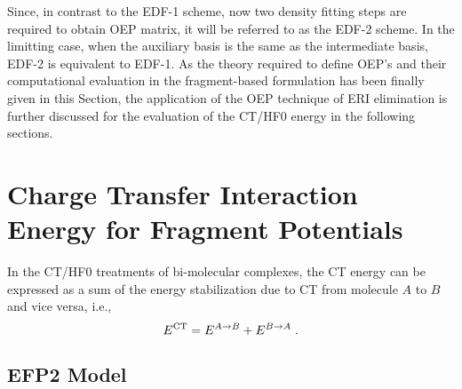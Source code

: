 \documentclass[aip,jcp,amsmath,amssymb,reprint,floatfix]{revtex4-1}
\begin{document}
Since, in contrast to the EDF-1 scheme, now two density fitting steps are required to
obtain OEP matrix, it will be referred to as the EDF-2 scheme.
In the limitting case, when the auxiliary basis is the same as the intermediate basis,
EDF-2 is equivalent to EDF-1.
As the theory required to define OEP's and their computational
evaluation in the fragment\hyp{}based formulation has been finally given in this Section,
the application of the OEP technique of ERI elimination is
further discussed for the evaluation of the CT/HF0 energy in the following sections.


\section{\label{s:3.ct}Charge Transfer Interaction Energy for Fragment Potentials}

In the CT/HF0 treatments of bi\hyp{}molecular complexes, the CT energy
can be expressed as a sum of the energy stabilization due to 
CT from molecule $A$ to $B$ and vice versa, i.e.,
%
\begin{equation} \label{e:ct-hf0}
 E^{\rm CT} =  E^{A\rightarrow B} + E^{B\rightarrow A}\;.
\end{equation}
%

\subsection{\label{ss:3.1.EFP2} EFP2 Model}
\end{document}
